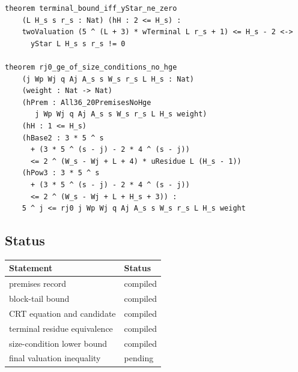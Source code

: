 \begin{verbatim}
theorem terminal_bound_iff_yStar_ne_zero
    (L H_s s r_s : Nat) (hH : 2 <= H_s) :
    twoValuation (5 ^ (L + 3) * wTerminal L r_s + 1) <= H_s - 2 <->
      yStar L H_s s r_s != 0

theorem rj0_ge_of_size_conditions_no_hge
    (j Wp Wj q Aj A_s s W_s r_s L H_s : Nat)
    (weight : Nat -> Nat)
    (hPrem : All36_20PremisesNoHge
       j Wp Wj q Aj A_s s W_s r_s L H_s weight)
    (hH : 1 <= H_s)
    (hBase2 : 3 * 5 ^ s
      + (3 * 5 ^ (s - j) - 2 * 4 ^ (s - j))
      <= 2 ^ (W_s - Wj + L + 4) * uResidue L (H_s - 1))
    (hPow3 : 3 * 5 ^ s
      + (3 * 5 ^ (s - j) - 2 * 4 ^ (s - j))
      <= 2 ^ (W_s - Wj + L + H_s + 3)) :
    5 ^ j <= rj0 j Wp Wj q Aj A_s s W_s r_s L H_s weight
\end{verbatim}

\subsection{Status}

\begin{center}
\small
\begin{tabular}{@{}p{}p{}@{}}
\toprule
Statement & Status \\
\midrule
premises record & compiled \\
block-tail bound & compiled \\
CRT equation and candidate & compiled \\
terminal residue equivalence & compiled \\
size-condition lower bound & compiled \\
final valuation inequality & pending \\
\bottomrule
\end{tabular}
\end{center}
